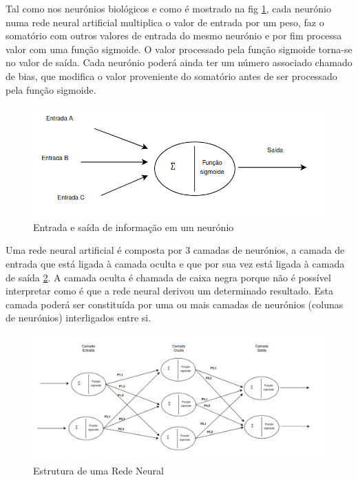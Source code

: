 Tal como nos neurónios biológicos e como é mostrado na fig \ref{node1}, cada neurónio numa rede neural artificial multiplica o valor de entrada por um peso, faz o somatório com outros valores de entrada do mesmo neurónio e por fim processa valor com uma função sigmoide. O valor processado pela função sigmoide torna-se no valor de saída. Cada neurónio poderá ainda ter um número associado chamado de bias, que modifica o valor proveniente do somatório antes de ser processado pela função sigmoide.


\begin{figure}[H]
\centering
\includegraphics[scale=0.3]{figs/node1.png}
\caption{Entrada e saída de informação em um neurónio} \label{node1}
\end{figure}

Uma rede neural artificial é composta por 3 camadas de neurónios, a camada de entrada que está ligada à camada oculta e que por sua vez está ligada à camada de saída \ref{ANN}. A camada oculta é chamada de caixa negra porque não é possível interpretar como é que a rede neural derivou um determinado resultado. Esta camada poderá ser constituída por uma ou mais camadas de neurónios (colunas de neurónios) interligados entre si.

\begin{figure}[H]
\centering
\includegraphics[scale=0.42]{figs/redeNeuralDraw}
\caption{Estrutura de uma Rede Neural}\label{ANN}
\end{figure}



